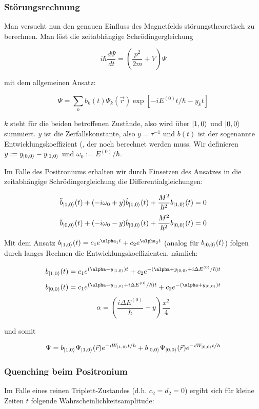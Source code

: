 \subsubsection{Störungsrechnung}

Man versucht nun den genauen Einfluss des Magnetfelds störungstheoretisch zu berechnen. Man löst die zeitabhängige Schrödingergleichung

$$ i\hbar \frac{d\Psi}{dt} = (\frac{p^2}{2m}+V)\Psi $$

mit dem allgemeinen Ansatz:

$$ \Psi = \sum_{k} b_k(t)\Psi_k(\vec r)\exp\left[-iE^{(0)}t/\hbar-y_kt\right] $$

$k$ steht für die beiden betroffenen Zustände, also wird über $\ket{1,0}$ und $\ket{0,0}$ summiert. $y$ ist die Zerfallskonstante, also $y = \tau^{-1}$ und $b(t)$ ist der sogenannte Entwicklungskoeffizient (, der noch berechnet werden muss. Wir definieren $y:=y_{\ket{0,0}}-y_{\ket{1,0}}$ und $\omega_0 := E^{(0)}/\hbar$. 

Im Falle des Positroniums erhalten wir durch Einsetzen des Ansatzes in die zeitabhängige Schrödingergleichung die Differentialgleichungen:

$$\ddot b_{\ket{1,0}}(t) + (-i\omega_0 + y) \dot b_{\ket{1,0}}(t) + \frac{M^2}{\hbar^2}b_{\ket{1,0}}(t) = 0$$
$$\ddot b_{\ket{0,0}}(t) + (-i\omega_0 - y) \dot b_{\ket{0,0}}(t) + \frac{M^2}{\hbar^2}b_{\ket{0,0}}(t) = 0$$

Mit dem Ansatz $b_{\ket{1,0}}(t) = c_1e^{\alpha_1t} + c_2e^{\alpha_2t}$ (analog für $b_{\ket{0,0}}(t)$) folgen durch langes Rechnen die Entwicklungskoeffizienten, nämlich:

$$ b_{\ket{1,0}}(t) = c_1e^{(\alpha -y_{\ket{1,0}})t} + c_2e^{-(\alpha + y_{\ket{0,0}}+ i\Delta E^{(0)}/\hbar)t} $$
$$ b_{\ket{0,0}}(t) = c_1e^{(\alpha -y_{\ket{1,0}} + i\Delta E^{(0)}/\hbar)t} + c_2e^{-(\alpha + y_{\ket{0,0}})t} $$
$$ \alpha = \left(\frac{i\Delta E^{(0)}}{\hbar} - y\right)\frac{x^2}{4} $$

und somit

$$ \Psi = b_{\ket{1,0}}\Psi_{\ket{1,0}}(\vec r)e^{-iW_{\ket{1,0}}t/\hbar} + b_{\ket{0,0}}\Psi_{\ket{0,0}}(\vec r)e^{-iW_{\ket{0,0}}t/\hbar} $$

\subsubsection{Quenching beim Positronium}

Im Falle eines reinen Triplett-Zustandes (d.h. $c_2=d_2=0$) ergibt sich für kleine Zeiten $t$ folgende Wahrscheinlichkeitsamplitude:

